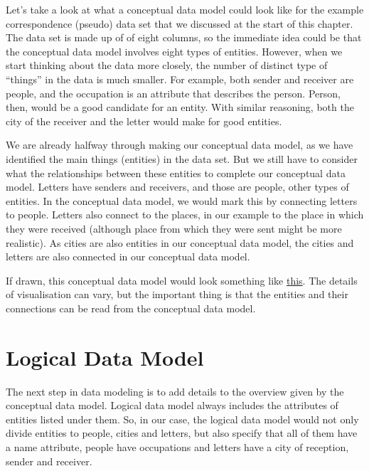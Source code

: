 \documentclass[
]{book}
\begin{document}
Let's take a look at what a conceptual data model could look like for the example correspondence (pseudo) data set that we discussed at the start of this chapter. The data set is made up of of eight columns, so the immediate idea could be that the conceptual data model involves eight types of entities. However, when we start thinking about the data more closely, the number of distinct type of ``things'' in the data is much smaller. For example, both sender and receiver are people, and the occupation is an attribute that describes the person. Person, then, would be a good candidate for an entity. With similar reasoning, both the city of the receiver and the letter would make for good entities.

We are already halfway through making our conceptual data model, as we have identified the main things (entities) in the data set. But we still have to consider what the relationships between these entities to complete our conceptual data model. Letters have senders and receivers, and those are people, other types of entities. In the conceptual data model, we would mark this by connecting letters to people. Letters also connect to the places, in our example to the place in which they were received (although place from which they were sent might be more realistic). As cities are also entities in our conceptual data model, the cities and letters are also connected in our conceptual data model.

If drawn, this conceptual data model would look something like \href{https://docs.google.com/presentation/d/1J5XqMFTlJysqI0s-4TsOamL7qz48ml38VQO0s5g1doE/pub?start=false\&loop=false\&delayms=3000\#slide=id.g21405589cb_1_0}{this}. The details of visualisation can vary, but the important thing is that the entities and their connections can be read
from the conceptual data model.

\hypertarget{logical-data-model}{%
\section{Logical Data Model}\label{logical-data-model}}

The next step in data modeling is to add details to the overview given by the conceptual data model. Logical data model always includes the attributes of entities listed under them. So, in our case, the logical data model would not only divide entities to people, cities and letters, but also specify that all of them have a name attribute, people have occupations and letters have a city of reception, sender and receiver.
\end{document}
